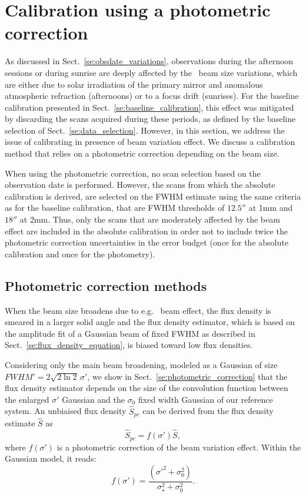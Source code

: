 \section{Calibration using a photometric correction}%
\label{se:photocorr_calibration}

As discussed in Sect.~\ref{se:obsdate_variations}, observations during the
afternoon sessions or
during sunrise are deeply affected by the \afternoon\ beam
size variations, which are either due to solar irradiation
of the primary mirror and anomalous atmospheric refraction
(afternoons) or to a focus drift (sunrises).
For the baseline calibration presented in
Sect.~\ref{se:baseline_calibration}, this effect was mitigated by
discarding the scans acquired during these periods, as defined by the
baseline selection of Sect.~\ref{se:data_selection}. However, in
this section, we address the issue of calibrating in presence of
\afternoon beam variation effect. We discuss a
calibration method that relies on a photometric correction
depending on the beam size. 

When using the photometric correction, no scan selection based on the
observation date is performed. However, the scans from which the
absolute calibration is derived, are selected on the FWHM estimate
using the same criteria as for the baseline calibration, that are FWHM
thresholds of $12.5''$ at 1mm and $18''$ at 2mm.  Thus, only
the scans that are moderately affected by the beam effect are included
in the absolute calibration in order not to include twice the
photometric correction uncertainties in the error budget (once for the
absolute calibration and once for the photometry).


\subsection{Photometric correction methods}
\label{se:photocorr_methods}

When the beam size broadens due to e.g. \afternoon\ beam effect, the
flux density is smeared in a larger solid angle and
the flux density estimator, which is based on the amplitude fit of a
Gaussian beam of fixed FWHM as described in
Sect.~\ref{se:flux_density_equation}, is biased toward low flux densities.

Considering only the main beam broadening, modeled as a Gaussian of
size $FWHM' = 2 \sqrt{2\ln{2}} \, \sigma '$, we show in
Sect.~\ref{se:photometric_correction} that
the flux density estimator depends on the size of the convolution
function between the enlarged $\sigma '$ Gaussian and the 
$\sigma_0$ fixed width Gaussian of our reference system. An unbiaised
flux density $\hat{S}_{pc}$ can be derived from the flux density
estimate $\hat{S}$ as
\begin{equation}
  \hat{S}_{pc} = f(\sigma')\hat{S},
\end{equation}
where $f(\sigma')$ is a photometric correction of the beam variation
effect. Within the Gaussian model, it reads:
\begin{equation}
  f(\sigma') = \frac{(\sigma'^2 + \sigma_0^2)}{\sigma_{\star}^2 + \sigma_0^2}. 
\end{equation} 

